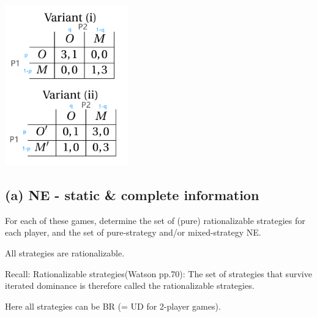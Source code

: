 \documentclass{article}
\begin{document}


\begin{center}
\includegraphics[width=0.4\textwidth]{9.q2}
\vspace{2mm}
\end{center}

%
\subsection*{(a) NE - static \& complete information}
For each of these games, determine the set of (pure) rationalizable strategies for each
player, and the set of pure-strategy and/or mixed-strategy NE.

\bigskip 

All strategies are rationalizable. 

\begin{mdframed}[backgroundcolor=blue!20,linecolor=white]
Recall: Rationalizable strategies(Watson pp.70): The set of strategies that
survive iterated dominance is therefore called the rationalizable strategies.

Here all strategies can be BR (= UD for 2-player games).
\end{mdframed}
\end{document}
